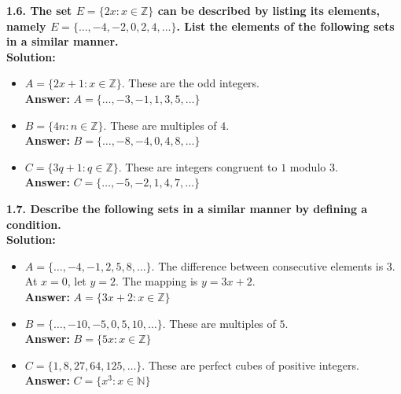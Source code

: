 \documentclass[12pt]{article}
\begin{document}
\vspace{0.5cm}
\textbf{1.6. The set $E = \{2x : x \in \mathbb{Z}\}$ can be described by listing its elements, namely $E = \{\dots, -4, -2, 0, 2, 4, \dots\}$. List the elements of the following sets in a similar manner.} \\
\textbf{Solution:}
\begin{itemize}
    \item[(a)] $A = \{2x + 1 : x \in \mathbb{Z}\}$. These are the odd integers. \\
    \textbf{Answer:} $A = \{\dots, -3, -1, 1, 3, 5, \dots\}$
    \item[(b)] $B = \{4n : n \in \mathbb{Z}\}$. These are multiples of $4$. \\
    \textbf{Answer:} $B = \{\dots, -8, -4, 0, 4, 8, \dots\}$
    \item[(c)] $C = \{3q + 1 : q \in \mathbb{Z}\}$. These are integers congruent to $1$ modulo $3$. \\
    \textbf{Answer:} $C = \{\dots, -5, -2, 1, 4, 7, \dots\}$
\end{itemize}

\vspace{0.5cm}
\textbf{1.7. Describe the following sets in a similar manner by defining a condition.} \\
\textbf{Solution:}
\begin{itemize}
    \item[(a)] $A = \{\dots, -4, -1, 2, 5, 8, \dots\}$. The difference between consecutive elements is $3$. At $x=0$, let $y=2$. The mapping is $y = 3x + 2$. \\
    \textbf{Answer:} $A = \{3x + 2 : x \in \mathbb{Z}\}$
    \item[(b)] $B = \{\dots, -10, -5, 0, 5, 10, \dots\}$. These are multiples of $5$. \\
    \textbf{Answer:} $B = \{5x : x \in \mathbb{Z}\}$
    \item[(c)] $C = \{1, 8, 27, 64, 125, \dots\}$. These are perfect cubes of positive integers. \\
    \textbf{Answer:} $C = \{x^3 : x \in \mathbb{N}\}$
\end{itemize}
\end{document}
